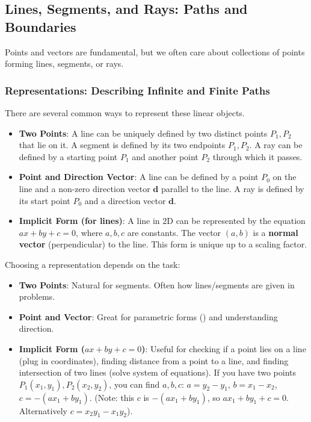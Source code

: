 \subsection{Lines, Segments, and Rays: Paths and Boundaries}
\label{ssec:A.1.2}

Points and vectors are fundamental, but we often care about collections of points forming lines, segments, or rays.

\subsubsection{Representations: Describing Infinite and Finite Paths}
\label{sssec:A.1.2.1}

There are several common ways to represent these linear objects.

\begin{definition}
\label{def:A.1.2.representations}
\begin{itemize}
    \item \textbf{Two Points}: A line can be uniquely defined by two distinct points $P_1, P_2$ that lie on it. A segment is defined by its two endpoints $P_1, P_2$. A ray can be defined by a starting point $P_1$ and another point $P_2$ through which it passes.
    \item \textbf{Point and Direction Vector}: A line can be defined by a point $P_0$ on the line and a non-zero direction vector $\mathbf{d}$ parallel to the line. A ray is defined by its start point $P_0$ and a direction vector $\mathbf{d}$.
    \item \textbf{Implicit Form (for lines)}: A line in 2D can be represented by the equation $ax + by + c = 0$, where $a, b, c$ are constants. The vector $(a,b)$ is a \textbf{normal vector} (perpendicular) to the line. This form is unique up to a scaling factor.
\end{itemize}
\end{definition}

\begin{intuition}
\label{intuition:A.1.2.representations}
Choosing a representation depends on the task:
\begin{itemize}
    \item \textbf{Two Points}: Natural for segments. Often how lines/segments are given in problems.
    \item \textbf{Point and Vector}: Great for parametric forms () and understanding direction.
    \item \textbf{Implicit Form ($ax+by+c=0$)}: Useful for checking if a point lies on a line (plug in coordinates), finding distance from a point to a line, and finding intersection of two lines (solve system of equations). If you have two points $P_1(x_1,y_1), P_2(x_2,y_2)$, you can find $a,b,c$: $a = y_2-y_1$, $b = x_1-x_2$, $c = -(a x_1 + b y_1)$. (Note: this $c$ is $-(ax_1+by_1)$, so $ax_1+by_1+c=0$. Alternatively $c = x_2 y_1 - x_1 y_2$).
\end{itemize}
\end{intuition}

